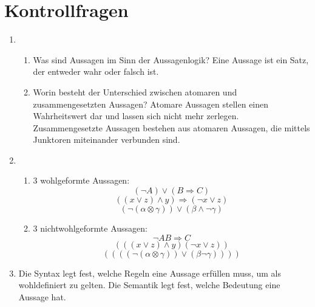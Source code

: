 \documentclass[a4paper]{article}
\begin{document}
	\section{Kontrollfragen}

	\begin{enumerate}
		\item
		\begin{enumerate}
			\item Was sind Aussagen im Sinn der Aussagenlogik?
			\newline
			Eine Aussage ist ein Satz, der entweder wahr oder falsch ist.
			
			\item Worin besteht der Unterschied zwischen atomaren und zusammengesetzten Aussagen?
			\newline
			Atomare Aussagen stellen einen Wahrheitswert dar und lassen sich nicht mehr zerlegen.
			Zusammengesetzte Aussagen bestehen aus atomaren Aussagen, die mittels Junktoren miteinander verbunden sind.
		\end{enumerate}
		
		\item
		\begin{enumerate}
			\item 3 wohlgeformte Aussagen:
			\begin{equation*}
				(\lnot A) \lor (B \Rightarrow C)
			\end{equation*}
			\begin{equation*}
				((x \lor z) \land y) \Rightarrow (\lnot x \lor z)
			\end{equation*}
			\begin{equation*}
				(\lnot(\alpha \otimes \gamma)) \lor (\beta \land \lnot\gamma)
			\end{equation*}
			
			\item 3 nichtwohlgeformte Aussagen:
			\begin{equation*}
				\lnot A B \Rightarrow C
			\end{equation*}
			\begin{equation*}
				(((x \lor z) \land y)(\lnot x \lor z))
			\end{equation*}
			\begin{equation*}
				((((\lnot(\alpha \otimes \gamma)) \lor (\beta \lnot\gamma))))
			\end{equation*}
			
		\end{enumerate}
		
		\item
		Die Syntax legt fest, welche Regeln eine Aussage erfüllen muss, um als wohldefiniert zu gelten. Die Semantik legt fest, welche Bedeutung eine Aussage hat.
		

\end{enumerate}
\end{document}
